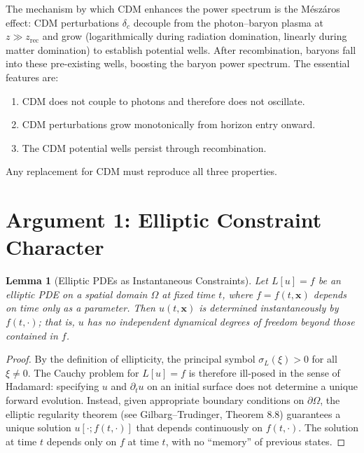 \documentclass[12pt,a4paper]{article}
\newtheorem{lemma}[theorem]{Lemma}
\begin{document}
The mechanism by which CDM enhances the power spectrum is the
M\'esz\'aros effect: CDM perturbations $\delta_c$ decouple from
the photon--baryon plasma at $z \gg z_{\mathrm{rec}}$ and grow
(logarithmically during radiation domination, linearly during matter
domination) to establish potential wells. After recombination, baryons
fall into these pre-existing wells, boosting the baryon power spectrum.
The essential features are:
\begin{enumerate}
\item CDM does not couple to photons and therefore does not oscillate.
\item CDM perturbations grow monotonically from horizon entry onward.
\item The CDM potential wells persist through recombination.
\end{enumerate}
Any replacement for CDM must reproduce all three properties.

\section{Argument 1: Elliptic Constraint Character}
\label{sec:arg1}

\begin{lemma}[Elliptic PDEs as Instantaneous Constraints]
\label{lem:elliptic}
Let $L[u] = f$ be an elliptic PDE on a spatial domain $\Omega$ at fixed
time $t$, where $f = f(t, \mathbf{x})$ depends on time only as a parameter.
Then $u(t, \mathbf{x})$ is determined instantaneously by $f(t, \cdot)$;
that is, $u$ has no independent dynamical degrees of freedom beyond
those contained in $f$.
\end{lemma}

\begin{proof}
By the definition of ellipticity, the principal symbol
$\sigma_L(\xi) > 0$ for all $\xi \neq 0$. The Cauchy problem for
$L[u] = f$ is therefore ill-posed in the sense of Hadamard: specifying
$u$ and $\partial_t u$ on an initial surface does not determine a unique
forward evolution. Instead, given appropriate boundary conditions on
$\partial\Omega$, the elliptic regularity theorem (see Gilbarg--Trudinger,
Theorem 8.8) guarantees a unique solution $u[\cdot; f(t,\cdot)]$ that
depends continuously on $f(t, \cdot)$. The solution at time $t$ depends
only on $f$ at time $t$, with no ``memory'' of previous states.
\end{proof}
\end{document}
